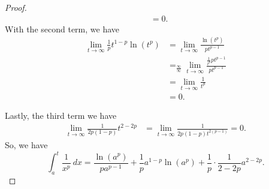 \documentclass[a4paper]{article}
\begin{document}
\begin{proof}
\begin{align*}
                                                             &=  0. 
\end{align*}
With the second term, we have
\begin{align*}
    \lim_{ t \to \infty  }  \frac{ 1 }{ p }  t^{1-p} \ln(t^{p}) &= \lim_{ t \to \infty  }  \frac{ \ln(t^{p}) }{ p t^{p-1} }    \\
                                                                &=_{\frac{ \infty  }{ \infty  } } \lim_{ t \to \infty  }  \frac{ \frac{ 1 }{ t^{p} }  p t^{p-1}    }{ p t^{p-1} }  \\
                                                                &= \lim_{ t \to \infty  }  \frac{ 1 }{ t^{p} }  \\
                                                                &= 0.
\end{align*}

Lastly, the third term we have 
\begin{align*}
    \lim_{ t \to \infty  }  \frac{ 1 }{ 2 p (1-p) } t^{2-2p} &= \lim_{ t \to \infty  }  \frac{ 1 }{ 2p (1-p) t^{2(p-1)} }  = 0. 
\end{align*}
So, we have 
\[  \int_{ a }^{ t }  \frac{ 1 }{ x^{p} }  \ dx = \frac{ \ln (a^{p}) }{ p a^{p-1} }  + \frac{ 1 }{ p } a^{1-p} \ln (a^{p}) + \frac{ 1 }{ p } \cdot \frac{ 1 }{ 2 - 2 p }  a^{2-2p}. \]
\end{proof}
\end{document}

